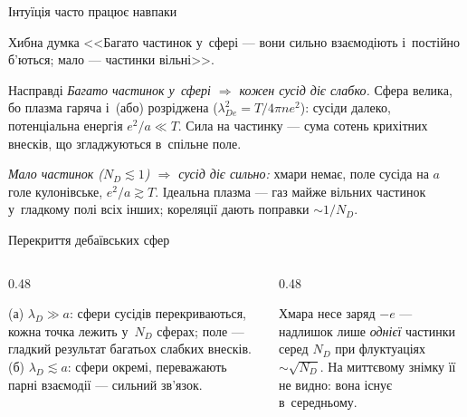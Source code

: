 \documentclass[]{beamer}
\begin{document}
\begin{frame}{Інтуїція часто працює навпаки}
	\begin{alertblock}{Хибна думка}\justifying\small
		<<Багато частинок у~сфері --- вони сильно взаємодіють і~постійно б'ються; мало --- частинки вільні>>.
	\end{alertblock}
	\begin{exampleblock}{Насправді}\justifying\small
		\emph{Багато частинок у~сфері $\Rightarrow$ кожен сусід діє слабко.} Сфера велика, бо плазма гаряча
		і~(або) розріджена ($\lambda_{De}^2=T/4\pi ne^2$): сусіди далеко, потенціальна енергія $e^2/a\ll T$.
		Сила на частинку --- сума сотень крихітних внесків, що згладжуються в~спільне поле.
	\end{exampleblock}
	\begin{block}{}\justifying\small
		\emph{Мало частинок ($N_D\lesssim1$) $\Rightarrow$ сусід діє сильно:} хмари немає, поле сусіда на $a$ голе кулонівське,
		$e^2/a\gtrsim T$. Ідеальна плазма --- газ майже вільних частинок у~гладкому полі всіх інших; кореляції дають
		поправки $\sim1/N_D$.
	\end{block}
\end{frame}

\begin{frame}{Перекриття дебаївських сфер}
	\centering
	\resizebox{!}{4.2cm}{}
	\begin{columns}[T]
		\begin{column}{0.48\linewidth}
			\begin{block}{}\justifying\tiny
				(а) $\lambda_D\gg a$: сфери сусідів \alert{перекриваються}, кожна точка лежить у~$N_D$ сферах; поле --- гладкий результат багатьох слабких внесків.
				(б) $\lambda_D\lesssim a$: сфери окремі, переважають парні взаємодії --- сильний зв'язок.
			\end{block}
		\end{column}
		\begin{column}{0.48\linewidth}
			\begin{alertblock}{}\justifying\tiny
				Хмара несе заряд $-e$ --- надлишок лише \emph{однієї} частинки серед $N_D$ при флуктуаціях $\sim\sqrt{N_D}$. На миттєвому знімку її не видно: вона існує в~середньому.
			\end{alertblock}
		\end{column}
	\end{columns}
\end{frame}

\end{document}
